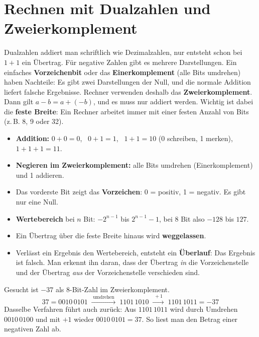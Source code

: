 \section{Rechnen mit Dualzahlen und Zweierkomplement}
\worum
Dualzahlen addiert man schriftlich wie Dezimalzahlen, nur entsteht schon bei $1 + 1$ ein Übertrag. Für negative Zahlen gibt es mehrere Darstellungen. Ein einfaches \textbf{Vorzeichenbit} oder das \textbf{Einerkomplement} (alle Bits umdrehen) haben Nachteile: Es gibt zwei Darstellungen der Null, und die normale Addition liefert falsche Ergebnisse. Rechner verwenden deshalb das \textbf{Zweierkomplement}. Dann gilt $a - b = a + (-b)$, und es muss nur addiert werden. Wichtig ist dabei die \textbf{feste Breite}: Ein Rechner arbeitet immer mit einer festen Anzahl von Bits (z.\,B. 8, 9 oder 32).

\begin{merke}
\begin{itemize}[itemsep=0.1em]
\item \textbf{Addition:} $0+0=0$, \ $0+1=1$, \ $1+1=10$ (0 schreiben, 1 merken), \ $1+1+1=11$.
\item \textbf{Negieren im Zweierkomplement:} alle Bits umdrehen (Einerkomplement) und 1 addieren.
\item Das vorderste Bit zeigt das \textbf{Vorzeichen}: 0 = positiv, 1 = negativ. Es gibt nur eine Null.
\item \textbf{Wertebereich} bei $n$ Bit: $-2^{n-1}$ bis $2^{n-1}-1$, bei 8 Bit also $-128$ bis $127$.
\item Ein Übertrag über die feste Breite hinaus wird \textbf{weggelassen}.
\item Verlässt ein Ergebnis den Wertebereich, entsteht ein \textbf{Überlauf}: Das Ergebnis ist falsch. Man erkennt ihn daran, dass der Übertrag \emph{in} die Vorzeichenstelle und der Übertrag \emph{aus} der Vorzeichenstelle verschieden sind.
\end{itemize}
\end{merke}

\beispiele
{}
Gesucht ist $-37$ als 8-Bit-Zahl im Zweierkomplement.
\[
37 = 0010\,0101
\;\xrightarrow{\;\text{umdrehen}\;}\; 1101\,1010
\;\xrightarrow{\;+1\;}\; 1101\,1011 = -37
\]
Dasselbe Verfahren führt auch zurück: Aus $1101\,1011$ wird durch Umdrehen $0010\,0100$ und mit $+1$ wieder $0010\,0101 = 37$. So liest man den Betrag einer negativen Zahl ab.

